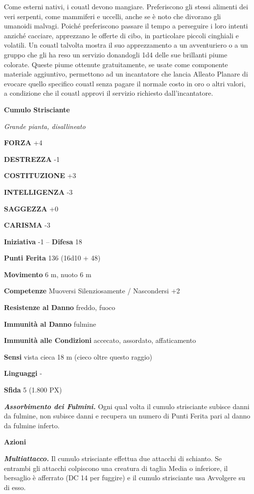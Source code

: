 \begin{multicols}{2}
	Come esterni nativi, i couatl devono mangiare. Preferiscono gli stessi alimenti dei veri serpenti, come mammiferi e uccelli, anche se è noto che divorano gli umanoidi malvagi. Poiché preferiscono passare il tempo a perseguire i loro intenti anziché cacciare, apprezzano le offerte di cibo, in particolare piccoli cinghiali e volatili. Un couatl talvolta mostra il suo apprezzamento a un avventuriero o a un gruppo che gli ha reso un servizio donandogli 1d4 delle sue brillanti piume colorate. Queste piume ottenute gratuitamente, se usate come componente materiale aggiuntivo, permettono ad un incantatore che lancia Alleato Planare di evocare quello specifico couatl senza pagare il normale costo in oro o altri valori, a condizione che il couatl approvi il servizio richiesto dall'incantatore.

	\medskip{}\textbf{Cumulo Strisciante}

	\textit{Grande pianta, disallineato}

	\textbf{FORZA} +4

	\textbf{DESTREZZA} -1

	\textbf{COSTITUZIONE} +3

	\textbf{INTELLIGENZA} -3

	\textbf{SAGGEZZA} +0

	\textbf{CARISMA} -3

	\textbf{Iniziativa} -1 -- \textbf{Difesa} 18

	\textbf{Punti Ferita} 136 (16d10 + 48)

	\textbf{Movimento} 6 m, nuoto 6 m

	\textbf{Competenze} Muoversi Silenziosamente / Nascondersi +2

	\textbf{Resistenze al Danno} freddo, fuoco

	\textbf{Immunità al Danno} fulmine

	\textbf{Immunità alle Condizioni} accecato, assordato, affaticamento

	\textbf{Sensi} vista cieca 18 m (cieco oltre questo raggio)

	\textbf{Linguaggi} -

	\textbf{Sfida} 5 (1.800 PX)

	\textit{\textbf{Assorbimento dei Fulmini.}} Ogni qual volta il cumulo strisciante subisce danni da fulmine, non subisce danni e recupera un numero di Punti Ferita pari al danno da fulmine inferto.

	\textbf{Azioni}

	\textit{\textbf{Multiattacco.}} Il cumulo strisciante effettua due attacchi di schianto. Se entrambi gli attacchi colpiscono una creatura di taglia Media o inferiore, il bersaglio è afferrato (DC 14 per fuggire) e il cumulo strisciante usa Avvolgere su di esso.


\end{multicols}

